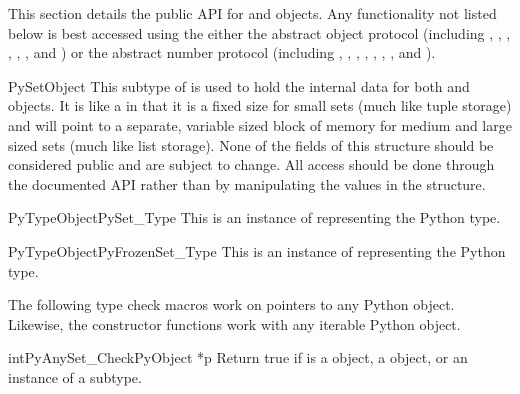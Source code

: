 
This section details the public API for  and 
objects.  Any functionality not listed below is best accessed using the
either the abstract object protocol (including
, ,
, ,
, , and
)
or the abstract number protocol (including
, ,
, ,
, ,
, and ).

\begin{ctypedesc}{PySetObject}
  This subtype of  is used to hold the internal data for
  both  and  objects.  It is like a
   in that it is a fixed size for small sets
  (much like tuple storage) and will point to a separate, variable sized
  block of memory for medium and large sized sets (much like list storage).
  None of the fields of this structure should be considered public and
  are subject to change.  All access should be done through the
  documented API rather than by manipulating the values in the structure.

\end{ctypedesc}

\begin{cvardesc}{PyTypeObject}{PySet_Type}
  This is an instance of  representing the Python
   type.
\end{cvardesc}

\begin{cvardesc}{PyTypeObject}{PyFrozenSet_Type}
  This is an instance of  representing the Python
   type.
\end{cvardesc}


The following type check macros work on pointers to any Python object.
Likewise, the constructor functions work with any iterable Python object.

\begin{cfuncdesc}{int}{PyAnySet_Check}{PyObject *p}
  Return true if  is a  object, a 
  object, or an instance of a subtype.
\end{cfuncdesc}

